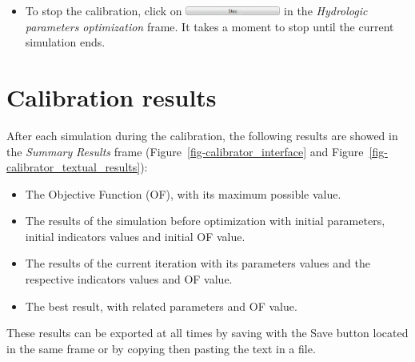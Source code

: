 \documentclass[
  letterpaper,
  DIV=11,
  numbers=noendperiod]{scrreprt}
\providecommand{\tightlist}{%
  \setlength{\itemsep}{0pt}\setlength{\parskip}{0pt}}\usepackage{longtable,booktabs,array}
\begin{document}
\begin{itemize}
\tightlist
\item
  {To stop the calibration, click on
  \includegraphics[width=\textwidth,height=0.11in]{./figures/fig-icon_calibrator_stop.png}
  in the \emph{Hydrologic parameters optimization} frame.} It takes a
  moment to stop until the current simulation ends.
\end{itemize}

\hypertarget{calibration-results}{%
\section{Calibration results}\label{calibration-results}}

After each simulation during the calibration, the following results are
showed in the \emph{Summary} \emph{Results} frame
(Figure~\ref{fig-calibrator_interface} and
Figure~\ref{fig-calibrator_textual_results}):

\begin{itemize}
\item
  The Objective Function (OF), with its maximum possible value.
\item
  The results of the simulation before optimization with initial
  parameters, initial indicators values and initial OF value.
\item
  The results of the current iteration with its parameters values and
  the respective indicators values and OF value.
\item
  The best result, with related parameters and OF value.
\end{itemize}

These results can be exported at all times by saving with the Save
button located in the same frame or by copying then pasting the text in
a file.
\end{document}
